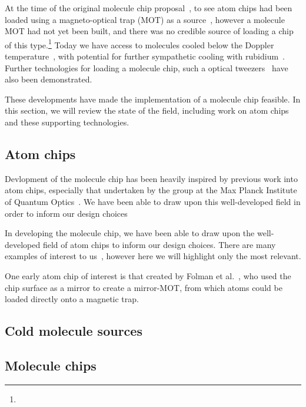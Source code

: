 At the time of the original molecule chip proposal~\cite{Andre2006}, to see atom
chips had been loaded using a magneto-optical trap (MOT) as a
source~\cite{Reichel1999, Ott2001}, however a molecule MOT had not yet been
built, and there was no credible source of loading a chip of this
type.\footnote{}
%
Today we have access to molecules cooled below the Doppler
temperature~\cite{Truppe2017}, with potential for further sympathetic cooling
with rubidium~. Further technologies for loading a
molecule chip, such a optical tweezers~\cite{Liueaar7797} have also been
demonstrated.

These developments have made the implementation of a molecule chip feasible. In
this section, we will review the state of the field, including work on atom
chips and these supporting technologies.

\subsection{Atom chips}

Devlopment of the molecule chip has been heavily inspired by previous work into
atom chips, especially that undertaken by the group at the Max Planck Institute
of Quantum Optics~\cite{rohtua, Treutlein2008, Boehi2009}. We have been able to
draw upon this well-developed field in order to inform our design choices

In developing the molecule chip, we have been able to draw upon the
well-developed field of atom chips to inform our design choices. There are many
examples of interest to us~, however here we will highlight only the most relevant.

One early atom chip of interest is that created by Folman et
al.~\cite{Folman2000}, who used the chip surface as a mirror to create a
mirror-MOT, from which  atoms could be loaded directly onto a
magnetic trap.


\subsection{Cold molecule sources}

\subsection{Molecule chips}

